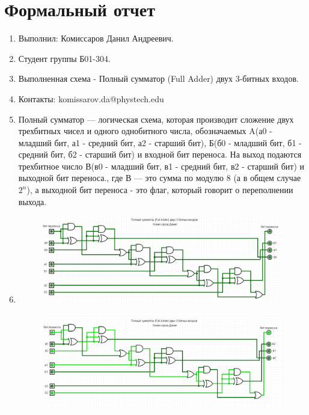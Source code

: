 \section{Формальный отчет}
\begin{enumerate}
    \item Выполнил: Комиссаров Данил Андреевич.
    \item Студент группы Б01-304.
    \item Выполненная схема - Полный сумматор (Full Adder) двух 3-битных входов.
    \item Контакты: komissarov.da@phystech.edu
    \item Полный сумматор — логическая схема, которая производит сложение двух трехбитных чисел и одного однобитного числа, обозначаемых A(а0 - младший бит, а1 - средний бит, а2 - старший бит), Б(б0 - младший бит, б1 - средний бит, б2 - старший бит) и входной бит переноса. На выход подаются трехбитное число В(в0 - младший бит, в1 - средний бит, в2 - старший бит) и выходной бит переноса., где В — это сумма по модулю 8 (а в общем случае $2^n$), а выходной бит переноса - это флаг, который говорит о переполнении выхода.
    \item 
    \begin{figure}[H]
        \centering
        \includegraphics[width=1\linewidth]{Formal/Photo1.png}
    \end{figure}
    \begin{figure}[H]
        \centering
        \includegraphics[width=1\linewidth]{Formal/Photo2.png}
    \end{figure}

\end{enumerate}
